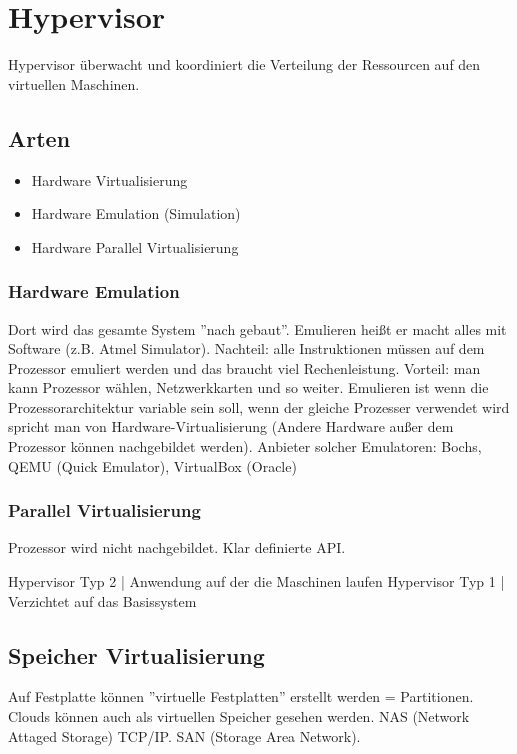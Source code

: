 \documentclass[a4paper]{report}
\begin{document}
\section{Hypervisor}

Hypervisor überwacht und koordiniert die Verteilung der Ressourcen auf den virtuellen Maschinen. 

 \subsection{Arten}
 
\begin{itemize}
\item Hardware Virtualisierung
\item Hardware Emulation (Simulation)
\item Hardware Parallel Virtualisierung
\end{itemize}


\subsubsection{Hardware Emulation}

Dort wird das gesamte System ''nach gebaut''. Emulieren heißt er macht alles mit Software (z.B. Atmel Simulator). Nachteil: alle Instruktionen müssen auf dem Prozessor emuliert werden und das braucht viel Rechenleistung. Vorteil: man kann Prozessor wählen, Netzwerkkarten und so weiter. Emulieren ist wenn die Prozessorarchitektur variable sein soll, wenn der gleiche Prozesser verwendet wird spricht man von Hardware-Virtualisierung (Andere Hardware außer dem Prozessor können nachgebildet werden).
\newline
\newline
Anbieter solcher Emulatoren: Bochs, QEMU (Quick Emulator), VirtualBox (Oracle)

\subsubsection{Parallel Virtualisierung}

Prozessor wird nicht nachgebildet. Klar definierte API.

Hypervisor Typ 2 | Anwendung auf der die Maschinen laufen
Hypervisor Typ 1 | Verzichtet auf das Basissystem


\subsection{Speicher Virtualisierung}

Auf Festplatte können ''virtuelle Festplatten'' erstellt werden = Partitionen. Clouds können auch als virtuellen Speicher gesehen werden. NAS (Network Attaged Storage) TCP/IP. SAN (Storage Area Network).
\end{document}
